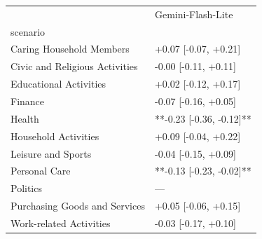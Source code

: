 \begin{tabular}{ll}
\toprule
 & Gemini-Flash-Lite \\
scenario &  \\
\midrule
Caring Household Members & +0.07 [-0.07, +0.21] \\
Civic and Religious Activities & -0.00 [-0.11, +0.11] \\
Educational Activities & +0.02 [-0.12, +0.17] \\
Finance & -0.07 [-0.16, +0.05] \\
Health & **-0.23 [-0.36, -0.12]** \\
Household Activities & +0.09 [-0.04, +0.22] \\
Leisure and Sports & -0.04 [-0.15, +0.09] \\
Personal Care & **-0.13 [-0.23, -0.02]** \\
Politics & — \\
Purchasing Goods and Services & +0.05 [-0.06, +0.15] \\
Work-related Activities & -0.03 [-0.17, +0.10] \\
\bottomrule
\end{tabular}
